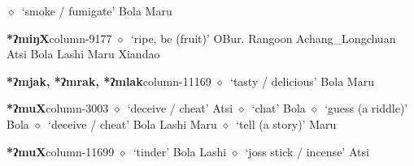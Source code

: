         $\diamond$~`smoke / fumigate'
         Bola 
\hspace{1ex}
         Maru 
  \item {\footnotesize \textbf{*ʔmiŋX}}{\tiny column-9177}
         $\diamond$~`ripe, be (fruit)'
         OBur. 
\hspace{1ex}
         Rangoon 
\hspace{1ex}
         Achang\_Longchuan 
\hspace{1ex}
         Atsi 
\hspace{1ex}
         Bola 
\hspace{1ex}
         Lashi 
\hspace{1ex}
         Maru 
\hspace{1ex}
         Xiandao 
  \item {\footnotesize \textbf{*ʔmjak, *ʔmrak, *ʔmlak}}{\tiny column-11169}
         $\diamond$~`tasty / delicious'
         Bola 
\hspace{1ex}
         Maru 
  \item {\footnotesize \textbf{*ʔmuX}}{\tiny column-3003}
         $\diamond$~`deceive / cheat'
         Atsi 
\hspace{1ex}
         $\diamond$~`chat'
         Bola 
\hspace{1ex}
         $\diamond$~`guess (a riddle)'
         Bola 
\hspace{1ex}
         $\diamond$~`deceive / cheat'
         Bola 
\hspace{1ex}
         Lashi 
\hspace{1ex}
         Maru 
\hspace{1ex}
         $\diamond$~`tell (a story)'
         Maru 
  \item {\footnotesize \textbf{*ʔmuX}}{\tiny column-11699}
         $\diamond$~`tinder'
         Bola 
\hspace{1ex}
         Lashi 
\hspace{1ex}
         $\diamond$~`joss stick / incense'
         Atsi 
